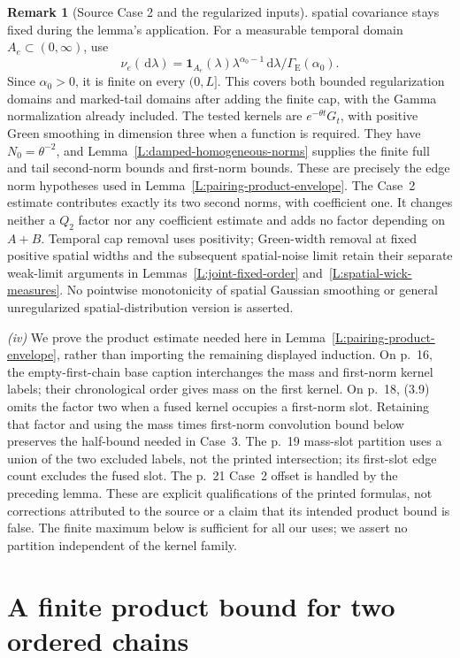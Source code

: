 \documentclass[12pt,oneside,openany]{book}
\numberwithin{equation}{section}
\theoremstyle{nogostyle}
\theoremstyle{definition}
\newtheorem{remark}[theorem]{Remark}
\newcommand{\ud}{\,\mathrm{d}}
\begin{document}
\begin{remark}[Source Case 2 and the regularized inputs]
  spatial covariance stays fixed during the lemma's application. For a
  measurable temporal domain $A_e \subset (0,\infty)$, use
  \[
    \nu_e(\ud\lambda)=\mathbf1_{A_e}(\lambda)
    \lambda^{\alpha_0-1}\ud\lambda/\Gamma_{\mathrm{E}}(\alpha_0).
  \]
  Since $\alpha_0 > 0$, it is finite on every $(0,L]$. This covers both bounded
  regularization domains and marked-tail domains after adding the finite cap,
  with the Gamma normalization already included. The tested kernels are
  $e^{-\theta t}G_t$, with positive Green smoothing in dimension three when a
  function is required. They have $N_0 = \theta^{-2}$, and
  Lemma~\ref{L:damped-homogeneous-norms} supplies the finite full and tail
  second-norm bounds and first-norm bounds. These are precisely the edge norm
  hypotheses used in Lemma~\ref{L:pairing-product-envelope}. The Case~2 estimate
  contributes exactly its two second norms, with coefficient one. It changes
  neither a $Q_2$ factor nor any coefficient estimate and adds no factor
  depending on $A+B$. Temporal cap removal uses positivity; Green-width removal
  at fixed positive spatial widths and the subsequent spatial-noise limit retain
  their separate weak-limit arguments in Lemmas~\ref{L:joint-fixed-order}
  and~\ref{L:spatial-wick-measures}. No pointwise monotonicity of spatial
  Gaussian smoothing or general unregularized spatial-distribution version is
  asserted.

  \emph{(iv)} We prove the product estimate needed here in
  Lemma~\ref{L:pairing-product-envelope}, rather than importing the remaining
  displayed induction. On p.~16, the empty-first-chain base caption interchanges
  the mass and first-norm kernel labels; their chronological order gives mass on
  the first kernel. On p.~18, (3.9) omits the factor two when a fused kernel
  occupies a first-norm slot. Retaining that factor and using the mass times
  first-norm convolution bound below preserves the half-bound needed in Case~3.
  The p.~19 mass-slot partition uses a union of the two excluded labels, not the
  printed intersection; its first-slot edge count excludes the fused slot. The
  p.~21 Case~2 offset is handled by the preceding lemma. These are explicit
  qualifications of the printed formulas, not corrections attributed to the
  source or a claim that its intended product bound is false. The finite maximum
  below is sufficient for all our uses; we assert no partition independent of
  the kernel family.
\end{remark}

\section{A finite product bound for two ordered chains}
\end{document}
